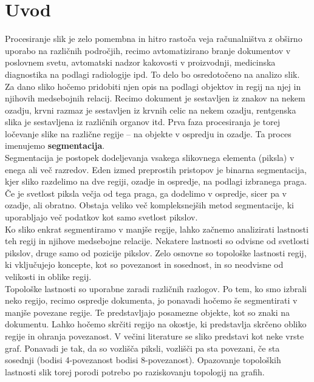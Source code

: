 \documentclass[a4paper, 12pt]{book}
\theoremstyle{definition}
\theoremstyle{remark}
\begin{document}
\chapter{Uvod}
Procesiranje slik je zelo pomembna in hitro rastoča veja računalništva z 
obširno uporabo na različnih področjih, recimo avtomatizirano branje dokumentov
v poslovnem svetu, avtomatski nadzor kakovosti v proizvodnji, medicinska diagnostika
na podlagi radiologije ipd. To delo bo osredotočeno na analizo slik.
Za dano sliko hočemo pridobiti njen opis na podlagi objektov in regij na njej
in njihovih medsebojnih relacij. Recimo dokument je sestavljen iz znakov na nekem ozadju, krvni razmaz je 
sestavljen iz krvnih celic na nekem ozadju, rentgenska slika je sestavljena
iz različnih organov itd. Prva faza procesiranja je torej ločevanje slike na
različne regije -- na objekte v ospredju in ozadje. Ta proces imenujemo \textbf{segmentacija}.\\
Segmentacija je postopek dodeljevanja vsakega slikovnega elementa (piksla) v enega ali več
razredov. Eden izmed preprostih pristopov je binarna segmentacija, kjer sliko razdelimo
na dve regiji, ozadje in ospredje, na podlagi izbranega praga. Če je svetlost piksla večja
od tega praga, ga dodelimo v ospredje, sicer pa v ozadje, ali obratno. Obstaja veliko več
kompleksnejših metod segmentacije, ki uporabljajo več podatkov kot samo svetlost
pikslov.\\
Ko sliko enkrat segmentiramo v manjše regije, lahko začnemo analizirati lastnosti
teh regij in njihove medsebojne relacije. Nekatere lastnosti so odvisne od svetlosti
pikslov, druge samo od pozicije pikslov. Zelo osnovne so topološke lastnosti
regij, ki vključujejo koncepte, kot so povezanost in sosednost, in so neodvisne od
velikosti in oblike regij.\\
Topološke lastnosti so uporabne zaradi različnih razlogov. Po tem, ko smo izbrali
neko regijo, recimo ospredje dokumenta, jo ponavadi hočemo še segmentirati v
manjše povezane regije. Te predstavljajo posamezne objekte, kot so znaki na dokumentu. Lahko
hočemo skrčiti regijo na okostje, ki predstavlja skrčeno obliko regije in ohranja
povezanost.
V večini literature se sliko predstavi kot neke vrste graf. Ponavadi je tak, da
so vozlišča piksli, vozlišči pa sta povezani, če sta sosednji (bodisi 4-povezanost
bodisi 8-povezanost). Opazovanje topoloških lastnosti slik torej porodi potrebo po
raziskovanju topologij na grafih.
\end{document}
